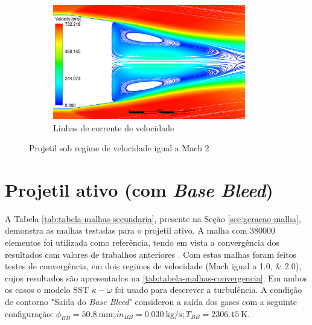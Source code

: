 \begin{figure}[!htpb]
    \hfill    
    \begin{subfigure}[b]{0.47\textwidth}
        \centering
        \includegraphics[height=5cm,width=\textwidth]{corrente-velocidade-off.png}
        \caption{Linhas de corrente de velocidade}
        \label{fig:corrente-velocidade-base-sembasebleed}    
    \end{subfigure}
	\caption{Projetil sob regime de velocidade igual a Mach \num{2}}
	\label{fig:contornos-pressao-velocidade-sembasebleed}
\end{figure}

\section{Projetil ativo (com \textit{Base Bleed})}\label{sec:resultados-com-basebleed}

A Tabela \ref{tab:tabela-malhas-secundaria}, presente na Seção \ref{sec:geracao-malha}, demonstra as malhas testadas para o projetil ativo. A malha com \num{380000} elementos foi utilizada como referência, tendo em vista a convergência dos resultados com valores de trabalhos anteriores \cite{Mahmoud2009}. Com estas malhas foram feitos testes de convergência, em dois regimes de velocidade (Mach igual a \numlist{1,0;2,0}), cujos resultados são apresentados na \autoref{tab:tabela-malhas-convergencia}. Em ambos os casos o modelo SST \(\kappa-\omega\) foi usado para descrever a turbulência. A condição de contorno "Saída do \textit{Base Bleed}"{} considerou a saída dos gases com a seguinte configuração: \(\phi_{BB} = \qty{50,8}{\milli\metre}; \Dot{m}_{BB} = \qty{0,030}{\kilogram\per\second}; T_{BB} = \qty{2306,15}{\kelvin}\).

